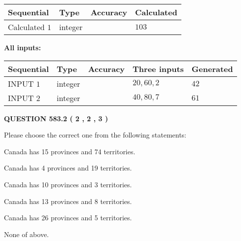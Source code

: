 \documentclass[12pt]{article}
\begin{document}
   
   
   
\noindent{}
   
   
  
  
\noindent\begin{tabular}{|l|l|l|l|}
\hline
 Sequential & Type & Accuracy & Calculated \\ 
\hline
 
 
  Calculated $  1 $ & integer &  & 
  $ 103 $ 
 \\  \hline  
 \end{tabular}
   
   
   
   
\noindent\vspace{0.1in}\hspace{-0.08in} {\textbf{\Large{All inputs: }}}
   
   
  
  
\noindent\begin{tabular}{|l|l|l|l|l|}
\hline
 Sequential & Type & Accuracy & Three inputs & Generated \\ 
\hline
 
 
  INPUT $  1 $ & integer &  & $
 20
 , 
 60
 , 
 2
 $ & $ 42 $ 
 \\  \hline  
 
 
  INPUT $  2 $ & integer &  & $
 40
 , 
 80
 , 
 7
 $ & $ 61 $ 
 \\  \hline  
 \end{tabular}
   
   
  
\vspace{0.2in}
  
{\textbf{\Large{QUESTION
583.2 
 ( 2 , 2 , 3 )
}}}
  
  
Please choose the correct one from the following statements:
 
 
Canada has  15 provinces and  74 territories.
 
 
Canada has   4 provinces and  19 territories.
 
 
Canada has 10  provinces and 3 territories.
 
 
Canada has  13 provinces and  8 territories.
 
 
Canada has  26 provinces and  5 territories.
 
 
 None of above.
 
\end{document}
